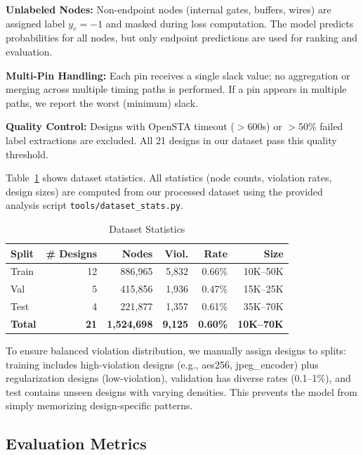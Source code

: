 \documentclass[10pt,twocolumn,journal]{IEEEtran}
\begin{document}
\textbf{Unlabeled Nodes:} Non-endpoint nodes (internal gates, buffers, wires) are assigned label $y_v = -1$ and masked during loss computation. The model predicts probabilities for all nodes, but only endpoint predictions are used for ranking and evaluation.

\textbf{Multi-Pin Handling:} Each pin receives a single slack value; no aggregation or merging across multiple timing paths is performed. If a pin appears in multiple paths, we report the worst (minimum) slack.

\textbf{Quality Control:} Designs with OpenSTA timeout ($>$600s) or $>$50\% failed label extractions are excluded. All 21 designs in our dataset pass this quality threshold.

Table~\ref{tab:dataset} shows dataset statistics. All statistics (node counts, violation rates, design sizes) are computed from our processed dataset using the provided analysis script \texttt{tools/dataset\_stats.py}.

\begin{table}[t]
\centering
\caption{Dataset Statistics}
\label{tab:dataset}
\begin{tabular}{@{}lrrrrr@{}}
\toprule
\textbf{Split} & \textbf{\# Designs} & \textbf{Nodes} & \textbf{Viol.} & \textbf{Rate} & \textbf{Size} \\
\midrule
Train & 12 & 886,965 & 5,832 & 0.66\% & 10K--50K \\
Val & 5 & 415,856 & 1,936 & 0.47\% & 15K--25K \\
Test & 4 & 221,877 & 1,357 & 0.61\% & 35K--70K \\
\midrule
\textbf{Total} & \textbf{21} & \textbf{1,524,698} & \textbf{9,125} & \textbf{0.60\%} & \textbf{10K--70K} \\
\bottomrule
\end{tabular}
\end{table}

To ensure balanced violation distribution, we manually assign designs to splits: training includes high-violation designs (e.g., aes256, jpeg\_encoder) plus regularization designs (low-violation), validation has diverse rates (0.1--1\%), and test contains unseen designs with varying densities. This prevents the model from simply memorizing design-specific patterns.

\subsection{Evaluation Metrics}
\end{document}

